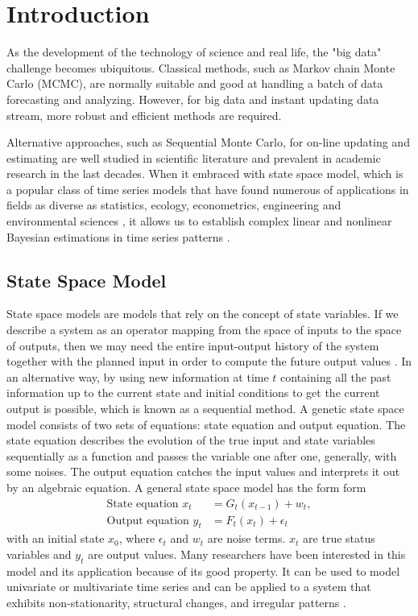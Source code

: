 
\section{Introduction}

As the development of the technology of science and real life, the "big data" challenge becomes ubiquitous. Classical methods, such as Markov chain Monte Carlo (MCMC), are normally suitable and good at handling a batch of data forecasting and analyzing. However, for big data and instant updating data stream, more robust and efficient methods are required. 


Alternative approaches, such as Sequential Monte Carlo, for on-line updating and estimating are well studied in scientific literature and prevalent in academic research in the last decades. When it embraced with  state space model, which is a popular class of time series models that have found numerous of applications in fields as diverse as statistics, ecology, econometrics, engineering and environmental sciences \cite{cappe2009inference} \cite{smcmip2011} \cite{elliott1995estimation} \cite{cargnoni1997bayesian}, it allows us to establish complex linear and nonlinear Bayesian estimations in time series patterns \cite{vieira2016online}. 


\subsection*{State Space Model}

State space models are models that rely on the concept of state variables. If we describe a system as an operator mapping from the space of inputs to the space of outputs, then we may need the entire input-output history of the system together with the planned input in order to compute the future output values \cite{hangos2006analysis}. In an alternative way, by using new information at time $t$ containing all the past information up to the current state and initial conditions to get the current output is possible, which is known as a sequential method. A genetic state space model consists of two sets of equations: state equation and output equation. The state equation describes the evolution of the true input and state variables sequentially as a function and passes the variable one after one, generally, with some noises. The output equation catches the input values and interprets it out by an algebraic equation. A general state space model has the form form
\begin{align}\label{statemodel1}
\mbox{State equation } x_t &= G_t(x_{t-1})+w_t,\\
\label{statemodel2}
\mbox{Output equation } y_t &=F_t(x_t)+\epsilon_t
\end{align}
with an initial state $x_0$, where $\epsilon_t$ and $w_t$ are noise terms. $x_t$ are true status variables and $y_t$ are output values. Many researchers have been interested in this model and its application because of its good property. It can be used to model univariate or multivariate time series and can be applied to a system that exhibits non-stationarity, structural changes, and irregular patterns \cite{petris2009dynamic}.

